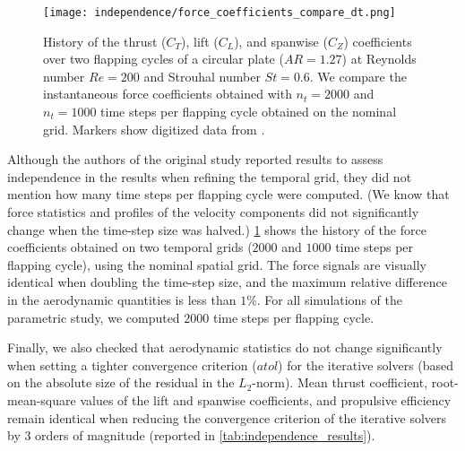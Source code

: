 \begin{figure}[!h]
  \centering
  \texttt{[image: independence/force\_coefficients\_compare\_dt.png]}
  \caption{History of the thrust ($C_T$), lift ($C_L$), and spanwise ($C_Z$) coefficients over two flapping cycles of a circular plate ($AR = 1.27$) at Reynolds number $Re = 200$ and Strouhal number $St = 0.6$. We compare the instantaneous force coefficients obtained with $n_t = 2000$ and $n_t = 1000$ time steps per flapping cycle obtained on the nominal grid. Markers show digitized data from \citet{li_dong_2016}.}
  \label{fig:independence_force_coefficients_dt}
\end{figure}

Although the authors of the original study reported results to assess independence in the results when refining the temporal grid, they did not mention how many time steps per flapping cycle were computed.
(We know that force statistics and profiles of the velocity components did not significantly change when the time-step size was halved.)
\cref{fig:independence_force_coefficients_dt} shows the history of the force coefficients obtained on two temporal grids ($2000$ and $1000$ time steps per flapping cycle), using the nominal spatial grid.
The force signals are visually identical when doubling the time-step size, and the maximum relative difference in the aerodynamic quantities is less than $1\%$.
For all simulations of the parametric study, we computed $2000$ time steps per flapping cycle.

Finally, we also checked that aerodynamic statistics do not change significantly when setting a tighter convergence criterion ($atol$) for the iterative solvers (based on the absolute size of the residual in the $L_2$-norm).
Mean thrust coefficient, root-mean-square values of the lift and spanwise coefficients, and propulsive efficiency remain identical when reducing the convergence criterion of the iterative solvers by 3 orders of magnitude (reported in \cref{tab:independence_results}).

